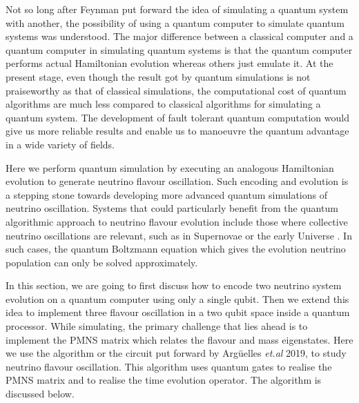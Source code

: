 \documentclass[12pt,a4paper]{report}
\begin{document}
Not so long after Feynman put forward the idea of simulating a quantum system with another, the possibility of using a quantum computer to simulate quantum systems was understood. The major difference between a classical computer and a quantum computer in simulating quantum systems is that the quantum computer performs actual Hamiltonian evolution whereas others just emulate it. At the present stage, even though the result got by quantum simulations is not praiseworthy as that of classical simulations, the computational cost of quantum algorithms are much less compared to classical algorithms for simulating a quantum system. The development of fault tolerant quantum computation would give us more reliable results and enable us to manoeuvre the quantum advantage in a wide variety of fields.\par
Here we perform quantum simulation by executing an analogous Hamiltonian evolution to generate neutrino flavour oscillation. Such encoding and evolution is a stepping stone towards developing more advanced quantum simulations of neutrino oscillation. Systems that could particularly benefit from the quantum algorithmic approach to neutrino flavour evolution include those where collective neutrino oscillations are relevant, such as in Supernovae or the early Universe \cite{jones}. In such cases, the quantum Boltzmann equation which gives the evolution neutrino population can only be solved approximately. \par
In this section, we are going to first discuss how to encode two neutrino system evolution on a quantum computer using only a single qubit. Then we extend this idea to implement three flavour oscillation in a two qubit space inside a quantum processor. While simulating, the primary challenge that lies ahead is to implement the PMNS matrix which relates the flavour and mass eigenstates. Here we use the algorithm or the circuit put forward by Arg\"uelles \emph{et.al} 2019, to study neutrino flavour oscillation. This algorithm uses quantum gates to realise the PMNS matrix and to realise the time evolution operator. The algorithm is discussed below.
\end{document}
